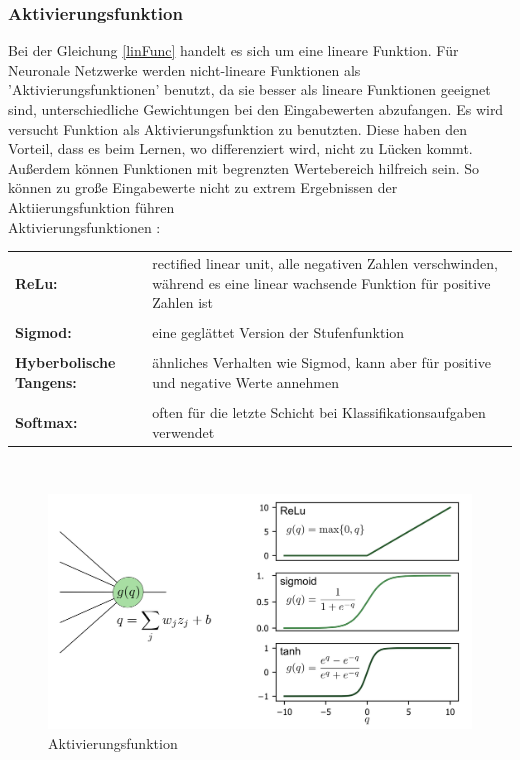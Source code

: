 \subsubsection{Aktivierungsfunktion}
Bei der Gleichung \ref{linFunc} handelt es sich um eine lineare Funktion.  Für Neuronale Netzwerke werden nicht-lineare Funktionen als 'Aktivierungsfunktionen' benutzt,  da sie besser als lineare Funktionen geeignet sind,  unterschiedliche Gewichtungen bei den Eingabewerten abzufangen.  Es wird versucht  Funktion als Aktivierungsfunktion zu benutzten. Diese haben den Vorteil, dass es beim Lernen, wo differenziert wird,  nicht zu Lücken kommt.  Außerdem können Funktionen mit begrenzten Wertebereich hilfreich sein. So können zu große Eingabewerte nicht zu extrem Ergebnissen der Aktiierungsfunktion führen  \\
Aktivierungsfunktionen \cite{Choo_2020}:\\
\begin{tabular}{lp{10cm}}
\textbf{ReLu: }& rectified linear unit, alle negativen Zahlen verschwinden,  während es eine linear wachsende Funktion für positive Zahlen ist\\
 & \\
\textbf{Sigmod: }& eine geglättet Version der Stufenfunktion\\
 & \\
\textbf{Hyberbolische Tangens: } & ähnliches Verhalten wie Sigmod, kann aber für positive und negative Werte annehmen\\
 & \\
\textbf{Softmax: } & often für die letzte Schicht bei Klassifikationsaufgaben verwendet\\
\end{tabular}
\\
\begin{figure}[h]
\centering
\includegraphics[scale=0.5]{pic/Aktivierungsfunktion}
\caption[Aktivierungsfunktion]{Aktivierungsfunktion \cite{Choo_2020}}
\end{figure}

